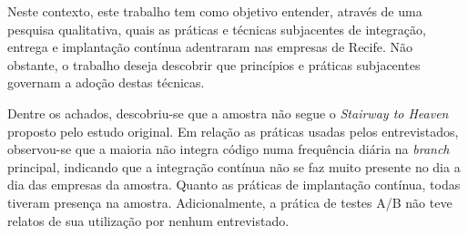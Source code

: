 Neste contexto, este trabalho tem como objetivo entender, através de uma pesquisa qualitativa, quais as práticas e técnicas subjacentes de integração, entrega e implantação contínua adentraram nas empresas de Recife. Não obstante, o trabalho deseja descobrir que princípios e práticas subjacentes governam a adoção destas técnicas.

Dentre os achados, descobriu-se que a amostra não segue o \emph{Stairway to Heaven}\cite{empiricalStudy2016} proposto pelo estudo original. Em relação as práticas usadas pelos entrevistados, observou-se que a maioria não integra código numa frequência diária na \emph{branch} principal, indicando que a integração contínua não se faz muito presente no dia a dia das empresas da amostra. Quanto as práticas de implantação contínua, todas tiveram presença na amostra. Adicionalmente, a prática de testes A/B não teve relatos de sua utilização por nenhum entrevistado.
